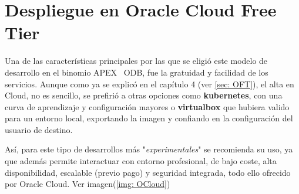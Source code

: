 \section{Despliegue en Oracle Cloud Free Tier}
Una de las características principales por las que se eligió este modelo de desarrollo en el binomio \acrshort{APEX} \ \acrshort{ODB}, fue la gratuidad y facilidad de los servicios. Aunque como ya se explicó en el capítulo 4 (ver \ref{sec: OFT}), el alta en Cloud, no es sencillo, se prefirió a otras opciones como \textbf{kubernetes}, con una curva de aprendizaje y configuración mayores o \textbf{virtualbox} que hubiera valido para un entorno local, exportando la imagen y confiando en la configuración del usuario de destino.

Así, para este tipo de desarrollos más "\textit{experimentales}" se recomienda su uso, ya que además permite interactuar con entorno profesional, de bajo coste, alta disponibilidad, escalable (previo pago) y seguridad integrada, todo ello ofrecido por Oracle Cloud. Ver imagen(\ref{img: OCloud})


